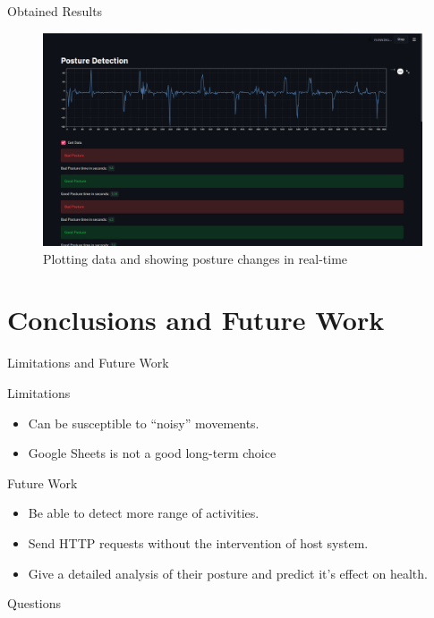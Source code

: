 \documentclass[aspectratio=169,xcolor=dvipsnames]{beamer}
\begin{document}
\begin{frame}{Obtained Results}
    \begin{figure}
        \centering
        \includegraphics[scale=0.18]{webappss2.png}
        \caption{Plotting data and showing posture changes in real-time}
        \label{fig:results}
    \end{figure}

\end{frame}

\section{Conclusions and Future Work}

\begin{frame}{Limitations and Future Work}
    \begin{block}{Limitations}
        \begin{itemize}
            \item Can be susceptible to ``noisy'' movements.
            \item Google Sheets is not a good long-term choice
        \end{itemize}
    \end{block}
    \begin{block}{Future Work}
        \begin{itemize}
            \item Be able to detect more range of activities.
            \item Send HTTP requests without the intervention of host system.
            \item Give a detailed analysis of their posture and predict it's
                effect on health.
        \end{itemize}

    \end{block}
\end{frame}

\begin{frame}
         \Huge{\centerline{Questions}}
\end{frame}
\end{document}

